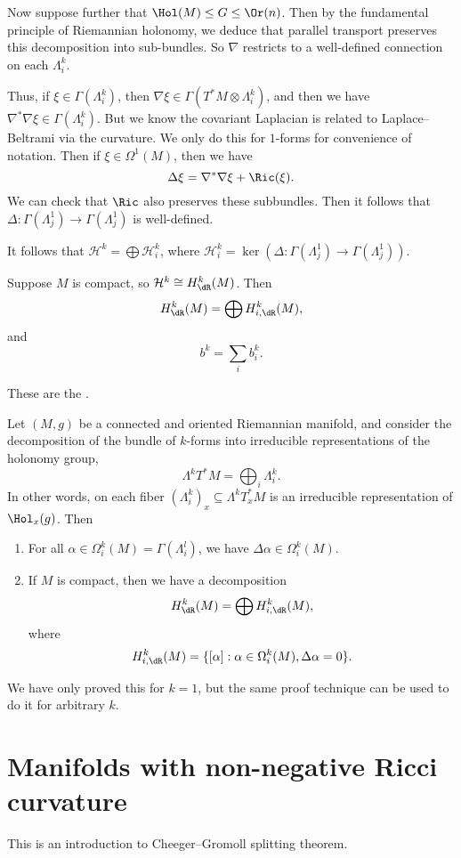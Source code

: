 \documentclass[a4paper]{article}
\begin{document}
Now suppose further that $\Hol(M) \leq G \leq \Or(n)$. Then by the fundamental principle of Riemannian holonomy, we deduce that parallel transport preserves this decomposition into sub-bundles. So $\nabla$ restricts to a well-defined connection on each $\Lambda^k_i$.

Thus, if $\xi \in \Gamma(\Lambda_i^k)$, then $\nabla \xi \in \Gamma(T^* M \otimes \Lambda^k_i)$, and then we have $\nabla^*\nabla \xi \in \Gamma(\Lambda_i^k)$. But we know the covariant Laplacian is related to Laplace--Beltrami via the curvature. We only do this for $1$-forms for convenience of notation. Then if $\xi \in \Omega^1(M)$, then we have
\[
  \Delta \xi = \nabla^* \nabla \xi + \Ric(\xi).
\]
We can check that $\Ric$ also preserves these subbundles. Then it follows that $\Delta: \Gamma(\Lambda_j^1) \to \Gamma(\Lambda^1_j)$ is well-defined.

It follows that $\mathcal{H}^k = \bigoplus \mathcal{H}^k_i$, where $\mathcal{H}^k_i = \ker (\Delta: \Gamma(\Lambda_j^1) \to \Gamma(\Lambda^1_j))$.
\begin{thm}
  Suppose $M$ is compact, so $\mathcal{H}^k \cong H^k_{\dR}(M)$. Then
  \[
    H_{\dR}^k (M) = \bigoplus H_{i, \dR}^k (M),
  \]
  and
  \[
    b^k = \sum_i b_i^k.
  \]
\end{thm}
These are the .

\begin{thm}
  Let $(M, g)$ be a connected and oriented Riemannian manifold, and consider the decomposition of the bundle of $k$-forms into irreducible representations of the holonomy group,
  \[
    \Lambda^k T^* M = \bigoplus_i \Lambda_i^k.
  \]
  In other words, on each fiber $(\Lambda_i^k)_x \subseteq \Lambda^k T^*_x M$ is an irreducible representation of $\Hol_x(g)$. Then
  \begin{enumerate}
    \item For all $\alpha \in \Omega^k_i(M) = \Gamma(\Lambda_i^l)$, we have $\Delta \alpha \in \Omega_i^k(M)$.
    \item If $M$ is compact, then we have a decomposition
      \[
        H_{\dR}^k (M) = \bigoplus H_{i, \dR}^k (M),
      \]
      where
      \[
        H^k_{i, \dR} (M) = \{[\alpha] : \alpha \in \Omega_i^k(M), \Delta \alpha = 0\}.
      \]
  \end{enumerate}
\end{thm}
We have only proved this for $k = 1$, but the same proof technique can be used to do it for arbitrary $k$.

\section{Manifolds with non-negative Ricci curvature}
This is an introduction to Cheeger--Gromoll splitting theorem.
\end{document}
